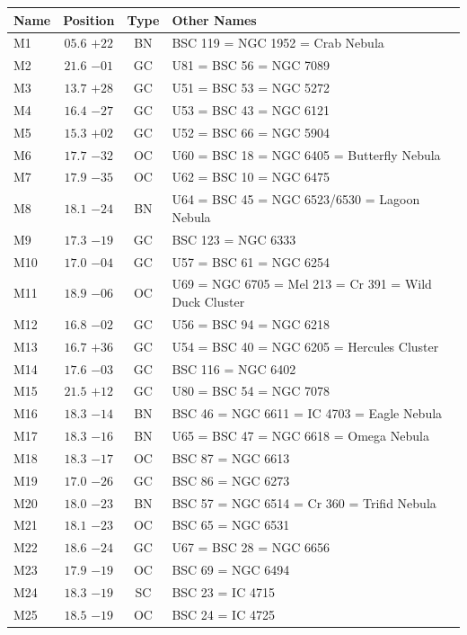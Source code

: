 
\begin{table}[t]
    \setlength{\tabcolsep}{2pt}
    \footnotesize
    \begin{tabularx}{\linewidth}{lccX}
        \hline
        Name&Position&Type&Other Names\\
        \hline

M1   &$05.6$ $+22$&BN &BSC 119 = NGC 1952 = Crab Nebula\\
M2   &$21.6$ $-01$&GC &U81 = BSC 56 = NGC 7089\\
M3   &$13.7$ $+28$&GC &U51 = BSC 53 = NGC 5272\\
M4   &$16.4$ $-27$&GC &U53 = BSC 43 = NGC 6121\\
M5   &$15.3$ $+02$&GC &U52 = BSC 66 = NGC 5904\\
M6   &$17.7$ $-32$&OC &U60 = BSC 18 = NGC 6405 = Butterfly Nebula\\
M7   &$17.9$ $-35$&OC &U62 = BSC 10 = NGC 6475\\
M8   &$18.1$ $-24$&BN &U64 = BSC 45 = NGC 6523/6530 = Lagoon Nebula\\
M9   &$17.3$ $-19$&GC &BSC 123 = NGC 6333\\
M10  &$17.0$ $-04$&GC &U57 = BSC 61 = NGC 6254\\
M11  &$18.9$ $-06$&OC &U69 = NGC 6705 = Mel 213 = Cr 391 = Wild Duck Cluster\\
M12  &$16.8$ $-02$&GC &U56 = BSC 94 = NGC 6218\\
M13  &$16.7$ $+36$&GC &U54 = BSC 40 = NGC 6205 = Hercules Cluster\\
M14  &$17.6$ $-03$&GC &BSC 116 = NGC 6402\\
M15  &$21.5$ $+12$&GC &U80 = BSC 54 = NGC 7078\\
M16  &$18.3$ $-14$&BN &BSC 46 = NGC 6611 = IC 4703 = Eagle Nebula\\
M17  &$18.3$ $-16$&BN &U65 = BSC 47 = NGC 6618 = Omega Nebula\\
M18  &$18.3$ $-17$&OC &BSC 87 = NGC 6613\\
M19  &$17.0$ $-26$&GC &BSC 86 = NGC 6273\\
M20  &$18.0$ $-23$&BN &BSC 57 = NGC 6514 = Cr 360 = Trifid Nebula\\
M21  &$18.1$ $-23$&OC &BSC 65 = NGC 6531\\
M22  &$18.6$ $-24$&GC &U67 = BSC 28 = NGC 6656\\
M23  &$17.9$ $-19$&OC &BSC 69 = NGC 6494\\
M24  &$18.3$ $-19$&SC &BSC 23 = IC 4715\\
M25  &$18.5$ $-19$&OC &BSC 24 = IC 4725\\

\end{tabularx}
\end{table}
